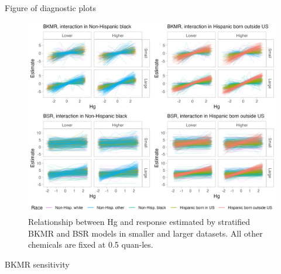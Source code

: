 \documentclass[12pt, twoside]{amherstthesis}
\begin{document}
Figure of diagnostic plots
\begin{figure}

{\centering \includegraphics[width=1\linewidth]{figures/ch4_re_expresp} 

}

\caption{Relationship between Hg and response estimated by stratified BKMR and BSR models in smaller and larger datasets. All other chemicals are fixed at 0.5 quan-les.}\label{fig:exprespre}
\end{figure}
BKMR sensitivity
\end{document}

